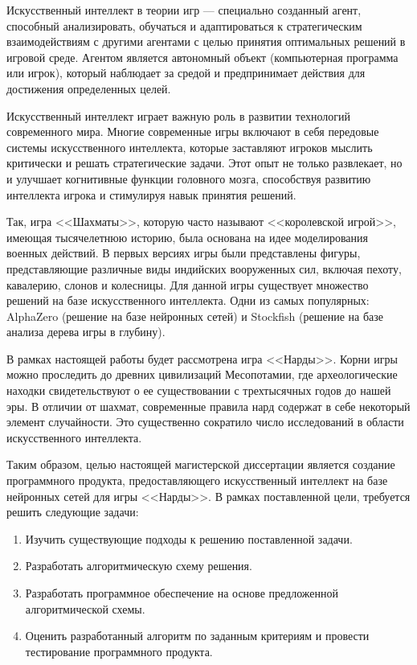 Искусственный интеллект в теории игр --- специально созданный агент, способный анализировать, обучаться и адаптироваться к стратегическим взаимодействиям с другими агентами с целью принятия оптимальных решений в игровой среде. Агентом является автономный объект (компьютерная программа или игрок), который наблюдает за средой и предпринимает действия для достижения определенных целей.

Искусственный интеллект играет важную роль в развитии технологий современного мира. Многие современные игры включают в себя передовые системы искусственного интеллекта, которые заставляют игроков мыслить критически и решать стратегические задачи. Этот опыт не только развлекает, но и улучшает когнитивные функции головного мозга, способствуя развитию интеллекта игрока и стимулируя навык принятия решений.

Так, игра <<Шахматы>>, которую часто называют <<королевской игрой>>, имеющая тысячелетнюю историю, была основана на идее моделирования военных действий. В первых версиях игры были представлены фигуры, представляющие различные виды индийских вооруженных сил, включая пехоту, кавалерию, слонов и колесницы. Для данной игры существует множество решений на базе искусственного интеллекта. Одни из самых популярных: AlphaZero (решение на базе нейронных сетей) и Stockfish (решение на базе анализа дерева игры в глубину).

В рамках настоящей работы будет рассмотрена игра <<Нарды>>. Корни игры можно проследить до древних цивилизаций Месопотамии, где археологические находки свидетельствуют о ее существовании с трехтысячных годов до нашей эры. В отличии от шахмат, современные правила нард содержат в себе некоторый элемент случайности. Это существенно сократило число исследований в области искусственного интеллекта.

\pagebreak

Таким образом, целью настоящей магистерской диссертации является создание программного продукта, предоставляющего искусственный интеллект на базе нейронных сетей для игры <<Нарды>>. В рамках поставленной цели, требуется решить следующие задачи:

\begin{enumerate}
    \item Изучить существующие подходы к решению поставленной задачи.
    \item Разработать алгоритмическую схему решения.
    \item Разработать программное обеспечение на основе предложенной алгоритмической схемы.
    \item Оценить разработанный алгоритм по заданным критериям и провести тестирование программного продукта.
\end{enumerate}
